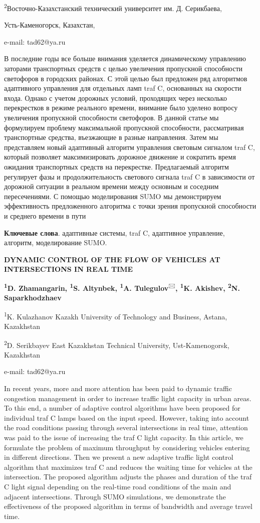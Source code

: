 \textsuperscript{2}Восточно-Казахстанский технический университет им. Д.
Серикбаева,

Усть-Каменогорск, Казахстан,

e-mail: tad62@ya.ru

В последние годы все больше внимания уделяется динамическому управлению
заторами транспортных средств с целью увеличения пропускной способности
светофоров в городских районах. С этой целью был предложен ряд
алгоритмов адаптивного управления для отдельных ламп traf C, основанных
на скорости входа. Однако с учетом дорожных условий, проходящих через
несколько перекрестков в режиме реального времени, внимание было уделено
вопросу увеличения пропускной способности светофоров. В данной статье мы
формулируем проблему максимальной пропускной способности, рассматривая
транспортные средства, въезжающие в разные направления. Затем мы
представляем новый адаптивный алгоритм управления световым сигналом traf
C, который позволяет максимизировать дорожное движение и сократить время
ожидания транспортных средств на перекрестке. Предлагаемый алгоритм
регулирует фазы и продолжительность светового сигнала traf C в
зависимости от дорожной ситуации в реальном времени между основным и
соседним пересечениями. С помощью моделирования SUMO мы демонстрируем
эффективность предложенного алгоритма с точки зрения пропускной
способности и среднего времени в пути

{\bfseries Ключевые слова}. адаптивные системы, traf C, адаптивное
управление, алгоритм, моделирование SUMO.

{\bfseries DYNAMIC CONTROL OF THE FLOW OF VEHICLES AT INTERSECTIONS IN REAL
TIME}

{\bfseries \textsuperscript{1}D. Zhamangarin, \textsuperscript{1}S.
Altynbek, \textsuperscript{1}A. Tulegulov}\textsuperscript{🖂}{\bfseries ,
\textsuperscript{1}K. Akishev, \textsuperscript{2}N. Saparkhodzhaev}

\textsuperscript{1}K. Kulazhanov Kazakh University of Technology and
Business, Astana, Kazakhstan

\textsuperscript{2}D. Serikbayev East Kazakhstan Technical University,
Ust-Kamenogorsk, Kazakhstan

e-mail: tad62@ya.ru

In recent years, more and more attention has been paid to dynamic
traffic congestion management in order to increase traffic light
capacity in urban areas. To this end, a number of adaptive control
algorithms have been proposed for individual traf C lamps based on the
input speed. However, taking into account the road conditions passing
through several intersections in real time, attention was paid to the
issue of increasing the traf C light capacity. In this article, we
formulate the problem of maximum throughput by considering vehicles
entering in different directions. Then we present a new adaptive traffic
light control algorithm that maximizes traf C and reduces the waiting
time for vehicles at the intersection. The proposed algorithm adjusts
the phases and duration of the traf C light signal depending on the
real-time road conditions of the main and adjacent intersections.
Through SUMO simulations, we demonstrate the effectiveness of the
proposed algorithm in terms of bandwidth and average travel time.

